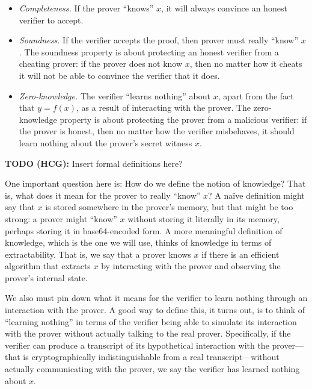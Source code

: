 \documentclass[
  letterpaper,
]{scrbook}
\newcommand{\todobox}[1]{{\color{todocolor}#1}}
\theoremstyle{definition}
\theoremstyle{plain}
\theoremstyle{plain}
\theoremstyle{remark}
\begin{document}
\begin{itemize}
\item
  \emph{Completeness.} If the prover ``knows'' \(x\), it will always
  convince an honest verifier to accept.
\item
  \emph{Soundness.} If the verifier accepts the proof, then prover must
  really ``know'' \(x\). The soundness property is about protecting an
  honest verifier from a cheating prover: if the prover does not know
  \(x\), then no matter how it cheats it will not be able to convince
  the verifier that it does.
\item
  \emph{Zero-knowledge.} The verifier ``learns nothing'' about \(x\),
  apart from the fact that \(y=f(x)\), as a result of interacting with
  the prover. The zero-knowledge property is about protecting the prover
  from a malicious verifier: if the prover is honest, then no matter how
  the verifier misbehaves, it should learn nothing about the prover's
  secret witness \(x\).
\end{itemize}

\todobox{\textbf{TODO (HCG):} Insert formal definitions here?}

One important question here is: How do we define the notion of
knowledge? That is, what does it mean for the prover to really ``know''
\(x\)? A naïve definition might say that \(x\) is stored somewhere in
the prover's memory, but that might be too strong: a prover might
``know'' \(x\) without storing it literally in its memory, perhaps
storing it in base64-encoded form. A more meaningful definition of
knowledge, which is the one we will use, thinks of knowledge in terms of
extractability. That is, we say that a prover knows \(x\) if there is an
efficient algorithm that extracts \(x\) by interacting with the prover
and observing the prover's internal state.

We also must pin down what it means for the verifier to learn nothing
through an interaction with the prover. A good way to define this, it
turns out, is to think of ``learning nothing'' in terms of the verifier
being able to simulate its interaction with the prover without actually
talking to the real prover. Specifically, if the verifier can produce a
transcript of its hypothetical interaction with the prover---that is
cryptographically indistinguishable from a real transcript---without
actually communicating with the prover, we say the verifier has learned
nothing about \(x\).

\end{document}
